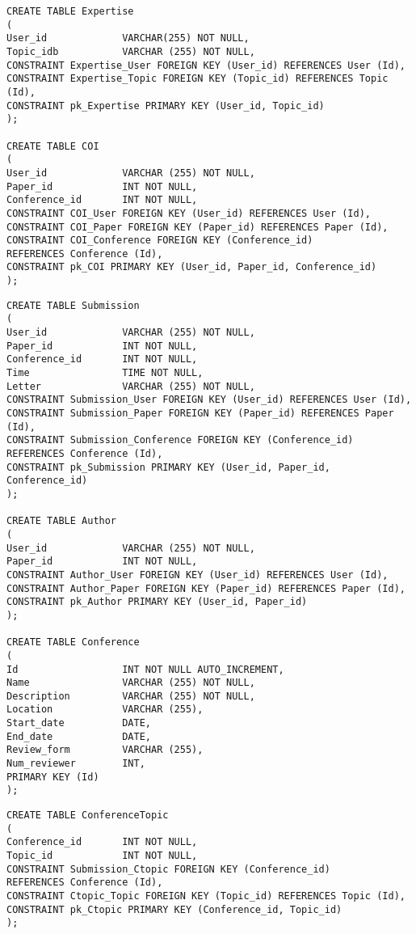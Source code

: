 \documentclass[12pt]{article}
\newcommand{\<}{\langle}
\renewcommand{\>}{\rangle}
\begin{document}
\begin{verbatim}
CREATE TABLE Expertise
(
User_id             VARCHAR(255) NOT NULL,
Topic_idb           VARCHAR (255) NOT NULL,
CONSTRAINT Expertise_User FOREIGN KEY (User_id) REFERENCES User (Id),
CONSTRAINT Expertise_Topic FOREIGN KEY (Topic_id) REFERENCES Topic (Id),
CONSTRAINT pk_Expertise PRIMARY KEY (User_id, Topic_id)
);

CREATE TABLE COI
(
User_id	            VARCHAR (255) NOT NULL,
Paper_id            INT NOT NULL,
Conference_id       INT NOT NULL,
CONSTRAINT COI_User FOREIGN KEY (User_id) REFERENCES User (Id),
CONSTRAINT COI_Paper FOREIGN KEY (Paper_id) REFERENCES Paper (Id),
CONSTRAINT COI_Conference FOREIGN KEY (Conference_id) 
REFERENCES Conference (Id),
CONSTRAINT pk_COI PRIMARY KEY (User_id, Paper_id, Conference_id)
);
\end{verbatim}
\pagebreak
\begin{verbatim}
CREATE TABLE Submission
(
User_id	            VARCHAR (255) NOT NULL,
Paper_id            INT NOT NULL,
Conference_id       INT NOT NULL,
Time                TIME NOT NULL,
Letter              VARCHAR (255) NOT NULL,
CONSTRAINT Submission_User FOREIGN KEY (User_id) REFERENCES User (Id),
CONSTRAINT Submission_Paper FOREIGN KEY (Paper_id) REFERENCES Paper (Id),
CONSTRAINT Submission_Conference FOREIGN KEY (Conference_id) 
REFERENCES Conference (Id),
CONSTRAINT pk_Submission PRIMARY KEY (User_id, Paper_id, Conference_id)
);

CREATE TABLE Author
(
User_id	            VARCHAR (255) NOT NULL,
Paper_id            INT NOT NULL,
CONSTRAINT Author_User FOREIGN KEY (User_id) REFERENCES User (Id),
CONSTRAINT Author_Paper FOREIGN KEY (Paper_id) REFERENCES Paper (Id),
CONSTRAINT pk_Author PRIMARY KEY (User_id, Paper_id)
);

CREATE TABLE Conference
(
Id                  INT NOT NULL AUTO_INCREMENT,
Name                VARCHAR (255) NOT NULL,
Description         VARCHAR (255) NOT NULL,
Location            VARCHAR (255),
Start_date          DATE,
End_date            DATE,
Review_form         VARCHAR (255),
Num_reviewer        INT,
PRIMARY KEY (Id)
);
\end{verbatim}
\pagebreak
\begin{verbatim}
CREATE TABLE ConferenceTopic
(
Conference_id       INT NOT NULL,
Topic_id            INT NOT NULL,
CONSTRAINT Submission_Ctopic FOREIGN KEY (Conference_id)
REFERENCES Conference (Id),
CONSTRAINT Ctopic_Topic FOREIGN KEY (Topic_id) REFERENCES Topic (Id),
CONSTRAINT pk_Ctopic PRIMARY KEY (Conference_id, Topic_id)
);
\end{verbatim}
\end{document}
